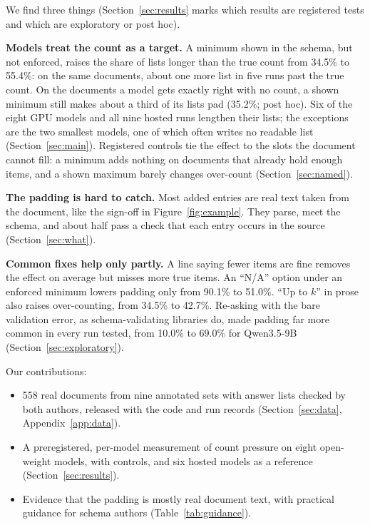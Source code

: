 We find three things (Section~\ref{sec:results} marks which results are registered tests and which are exploratory or post hoc).

\textbf{Models treat the count as a target.}
A minimum shown in the schema, but not enforced, raises the share of lists longer than the true count from 34.5\% to 55.4\%: on the same documents, about one more list in five runs past the true count.
On the documents a model gets exactly right with no count, a shown minimum still makes about a third of its lists pad (35.2\%; post hoc).
Six of the eight GPU models and all nine hosted runs lengthen their lists; the exceptions are the two smallest models, one of which often writes no readable list (Section~\ref{sec:main}).
Registered controls tie the effect to the slots the document cannot fill: a minimum adds nothing on documents that already hold enough items, and a shown maximum barely changes over-count (Section~\ref{sec:named}).

\textbf{The padding is hard to catch.}
Most added entries are real text taken from the document, like the sign-off in Figure~\ref{fig:example}.
They parse, meet the schema, and about half pass a check that each entry occurs in the source (Section~\ref{sec:what}).

\textbf{Common fixes help only partly.}
A line saying fewer items are fine removes the effect on average but misses more true items.
An ``N/A'' option under an enforced minimum lowers padding only from 90.1\% to 51.0\%.
``Up to $k$'' in prose also raises over-counting, from 34.5\% to 42.7\%.
Re-asking with the bare validation error, as schema-validating libraries do, made padding far more common in every run tested, from 10.0\% to 69.0\% for Qwen3.5-9B (Section~\ref{sec:exploratory}).

Our contributions:
\begin{itemize}
  \setlength\itemsep{0pt}
  \item 558 real documents from nine annotated sets with answer lists checked by both authors, released with the code and run records (Section~\ref{sec:data}, Appendix~\ref{app:data}).
  \item A preregistered, per-model measurement of count pressure on eight open-weight models, with controls, and six hosted models as a reference (Section~\ref{sec:results}).
  \item Evidence that the padding is mostly real document text, with practical guidance for schema authors (Table~\ref{tab:guidance}).
\end{itemize}
